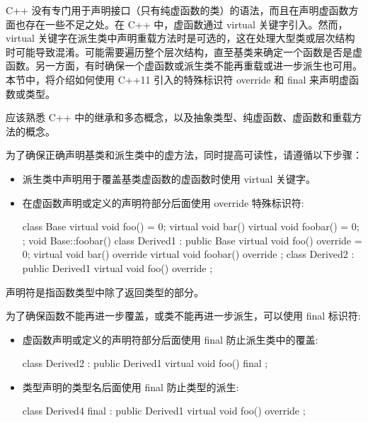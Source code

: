 C++ 没有专门用于声明接口（只有纯虚函数的类）的语法，而且在声明虚函数方面也存在一些不足之处。在 C++ 中，虚函数通过 virtual 关键字引入。然而，virtual 关键字在派生类中声明重载方法时是可选的，这在处理大型类或层次结构时可能导致混淆。可能需要遍历整个层次结构，直至基类来确定一个函数是否是虚函数。另一方面，有时确保一个虚函数或派生类不能再重载或进一步派生也可用。本节中，将介绍如何使用 C++11 引入的特殊标识符 override 和 final 来声明虚函数或类型。


应该熟悉 C++ 中的继承和多态概念，以及抽象类型、纯虚函数、虚函数和重载方法的概念。


为了确保正确声明基类和派生类中的虚方法，同时提高可读性，请遵循以下步骤：

\begin{itemize}
\item
派生类中声明用于覆盖基类虚函数的虚函数时使用 virtual 关键字。

\item
在虚函数声明或定义的声明符部分后面使用 override 特殊标识符:

\begin{cpp}
class Base
{
    virtual void foo() = 0;
    virtual void bar() {}
    virtual void foobar() = 0;
};
void Base::foobar() {}
class Derived1 : public Base
{
    virtual void foo() override = 0;
    virtual void bar() override {}
    virtual void foobar() override {}
};
class Derived2 : public Derived1
{
    virtual void foo() override {}
};
\end{cpp}
\end{itemize}

\begin{myNotic}
声明符是指函数类型中除了返回类型的部分。
\end{myNotic}

为了确保函数不能再进一步覆盖，或类不能再进一步派生，可以使用 final 标识符:

\begin{itemize}
\item
虚函数声明或定义的声明符部分后面使用 final 防止派生类中的覆盖:

\begin{cpp}
class Derived2 : public Derived1
{
    virtual void foo() final {}
};
\end{cpp}

\item
类型声明的类型名后面使用 final 防止类型的派生:

\begin{cpp}
class Derived4 final : public Derived1
{
    virtual void foo() override {}
};
\end{cpp}

\end{itemize}

